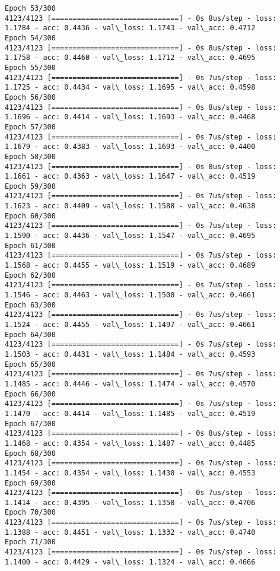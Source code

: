 \documentclass[11pt]{article}
\begin{document}
\begin{Verbatim}[commandchars=\\\{\}]
Epoch 53/300
4123/4123 [==============================] - 0s 8us/step - loss: 1.1784 - acc: 0.4436 - val\_loss: 1.1743 - val\_acc: 0.4712
Epoch 54/300
4123/4123 [==============================] - 0s 8us/step - loss: 1.1758 - acc: 0.4460 - val\_loss: 1.1712 - val\_acc: 0.4695
Epoch 55/300
4123/4123 [==============================] - 0s 7us/step - loss: 1.1725 - acc: 0.4434 - val\_loss: 1.1695 - val\_acc: 0.4598
Epoch 56/300
4123/4123 [==============================] - 0s 8us/step - loss: 1.1696 - acc: 0.4414 - val\_loss: 1.1693 - val\_acc: 0.4468
Epoch 57/300
4123/4123 [==============================] - 0s 7us/step - loss: 1.1679 - acc: 0.4383 - val\_loss: 1.1693 - val\_acc: 0.4400
Epoch 58/300
4123/4123 [==============================] - 0s 8us/step - loss: 1.1661 - acc: 0.4363 - val\_loss: 1.1647 - val\_acc: 0.4519
Epoch 59/300
4123/4123 [==============================] - 0s 7us/step - loss: 1.1623 - acc: 0.4409 - val\_loss: 1.1588 - val\_acc: 0.4638
Epoch 60/300
4123/4123 [==============================] - 0s 7us/step - loss: 1.1590 - acc: 0.4436 - val\_loss: 1.1547 - val\_acc: 0.4695
Epoch 61/300
4123/4123 [==============================] - 0s 7us/step - loss: 1.1568 - acc: 0.4455 - val\_loss: 1.1519 - val\_acc: 0.4689
Epoch 62/300
4123/4123 [==============================] - 0s 7us/step - loss: 1.1546 - acc: 0.4463 - val\_loss: 1.1500 - val\_acc: 0.4661
Epoch 63/300
4123/4123 [==============================] - 0s 7us/step - loss: 1.1524 - acc: 0.4455 - val\_loss: 1.1497 - val\_acc: 0.4661
Epoch 64/300
4123/4123 [==============================] - 0s 7us/step - loss: 1.1503 - acc: 0.4431 - val\_loss: 1.1484 - val\_acc: 0.4593
Epoch 65/300
4123/4123 [==============================] - 0s 7us/step - loss: 1.1485 - acc: 0.4446 - val\_loss: 1.1474 - val\_acc: 0.4570
Epoch 66/300
4123/4123 [==============================] - 0s 7us/step - loss: 1.1470 - acc: 0.4414 - val\_loss: 1.1485 - val\_acc: 0.4519
Epoch 67/300
4123/4123 [==============================] - 0s 8us/step - loss: 1.1468 - acc: 0.4354 - val\_loss: 1.1487 - val\_acc: 0.4485
Epoch 68/300
4123/4123 [==============================] - 0s 7us/step - loss: 1.1454 - acc: 0.4354 - val\_loss: 1.1430 - val\_acc: 0.4553
Epoch 69/300
4123/4123 [==============================] - 0s 7us/step - loss: 1.1414 - acc: 0.4395 - val\_loss: 1.1358 - val\_acc: 0.4706
Epoch 70/300
4123/4123 [==============================] - 0s 7us/step - loss: 1.1388 - acc: 0.4451 - val\_loss: 1.1332 - val\_acc: 0.4740
Epoch 71/300
4123/4123 [==============================] - 0s 7us/step - loss: 1.1400 - acc: 0.4429 - val\_loss: 1.1324 - val\_acc: 0.4666

\end{Verbatim}
\end{document}
